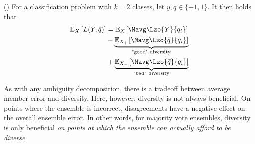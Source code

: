 \documentclass[../main.tex]{subfiles}
\begin{document}
\begin{corollary} (\cite{kuncheva})
For a classification problem with $k=2$ classes, let $y, \bar{q} \in \{ -1, 1 \}$. It then holds that
\begin{align*}
\mathbb{E}_{X}\left[   L(Y, \bar{q}) \right] 
&= 
\mathbb{E}_{X}\left[    \Mavg \Lzo{Y}{q_{i}}  \right] \\
&- 
\underbrace{
\mathbb{E}_{X_{+}}\left[ \Mavg \Lzo{\bar{q}}{q_{i}} \right]  
}_{\text{"good" diversity}} \\
&+ 
\underbrace{
\mathbb{E}_{X_{-}}\left[ \Mavg \Lzo{\bar{q}}{q_{i}} \right] 
}_{\text{"bad" diversity}}
\end{align*}
\end{corollary}


As with any ambiguity decomposition, there is a tradeoff between average member error and diversity. Here, however, diversity is not always beneficial. On points where the ensemble is incorrect, disagreements have a negative effect on the overall ensemble error.
In other words, for majority vote ensembles, diversity is only beneficial \textit{on points at which the ensemble can actually afford to be diverse}. 
\end{document}
